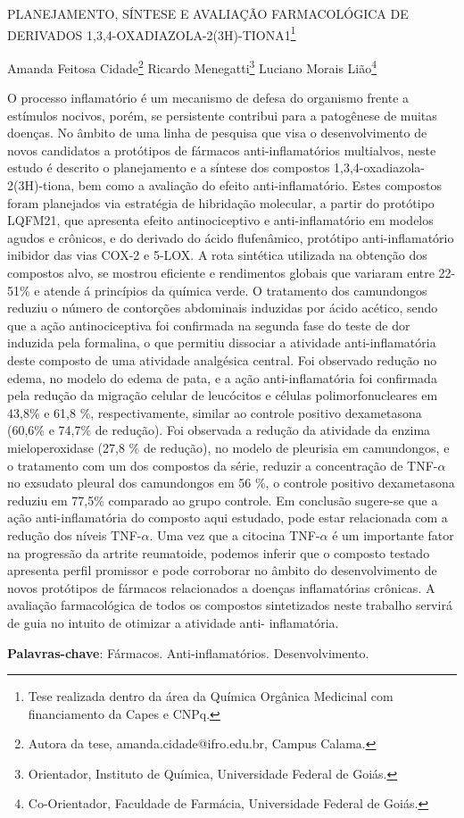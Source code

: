 \documentclass[article,12pt,onesidea,4paper,english,brazil]{abntex2}
\begin{document}
	
	
	\frenchspacing 
	
	\begin{center}
		\LARGE PLANEJAMENTO, SÍNTESE E AVALIAÇÃO FARMACOLÓGICA DE DERIVADOS 1,3,4-OXADIAZOLA-2(3H)-TIONA1\footnote{Tese realizada dentro da área da Química Orgânica Medicinal com financiamento da Capes e CNPq.}
		
		\normalsize
		Amanda Feitosa Cidade\footnote{Autora da tese, amanda.cidade@ifro.edu.br, Campus Calama.} 
		Ricardo Menegatti\footnote{Orientador, Instituto de Química, Universidade Federal de Goiás.} 
		Luciano Morais Lião\footnote{Co-Orientador, Faculdade de Farmácia, Universidade Federal de Goiás.} 
	\end{center}
	
	\noindent O processo inflamatório é um mecanismo de defesa do organismo frente a estímulos
	nocivos, porém, se persistente contribui para a patogênese de muitas doenças. No
	âmbito de uma linha de pesquisa que visa o desenvolvimento de novos candidatos a
	protótipos de fármacos anti-inflamatórios multialvos, neste estudo é descrito o
	planejamento e a síntese dos compostos 1,3,4-oxadiazola-2(3H)-tiona, bem como a
	avaliação do efeito anti-inflamatório. Estes compostos foram planejados via
	estratégia de hibridação molecular, a partir do protótipo LQFM21, que apresenta
	efeito antinociceptivo e anti-inflamatório em modelos agudos e crônicos, e do
	derivado do ácido flufenâmico, protótipo anti-inflamatório inibidor das vias COX-2 e
	5-LOX. A rota sintética utilizada na obtenção dos compostos alvo, se mostrou
	eficiente e rendimentos globais que variaram entre 22-51\% e atende á princípios da
	química verde. O tratamento dos camundongos reduziu o número de contorções
	abdominais induzidas por ácido acético, sendo que a ação antinociceptiva foi
	confirmada na segunda fase do teste de dor induzida pela formalina, o que permitiu
	dissociar a atividade anti-inflamatória deste composto de uma atividade analgésica
	central. Foi observado redução no edema, no modelo do edema de pata, e a ação
	anti-inflamatória foi confirmada pela redução da migração celular de leucócitos e
	células polimorfonucleares em 43,8\% e 61,8 \%, respectivamente, similar ao controle
	positivo dexametasona (60,6\% e 74,7\% de redução). Foi observada a redução da
	atividade da enzima mieloperoxidase (27,8 \% de redução), no modelo de pleurisia
	em camundongos, e o tratamento com um dos compostos da série, reduzir a
	concentração de TNF-$\alpha$ no exsudato pleural dos camundongos em 56 \%, o controle
	positivo dexametasona reduziu em 77,5\% comparado ao grupo controle. Em
	conclusão sugere-se que a ação anti-inflamatória do composto aqui estudado, pode
	estar relacionada com a redução dos níveis TNF-$\alpha$. Uma vez que a citocina TNF-$\alpha$ é
	um importante fator na progressão da artrite reumatoide, podemos inferir que o
	composto testado apresenta perfil promissor e pode corroborar no âmbito do
	desenvolvimento de novos protótipos de fármacos relacionados a doenças
	inflamatórias crônicas. A avaliação farmacológica de todos os compostos sintetizados neste trabalho servirá de guia no intuito de otimizar a atividade anti-
	inflamatória.
	
	\vspace{\onelineskip}
	
	\noindent
	\textbf{Palavras-chave}: Fármacos. Anti-inflamatórios. Desenvolvimento.
	
\end{document}
